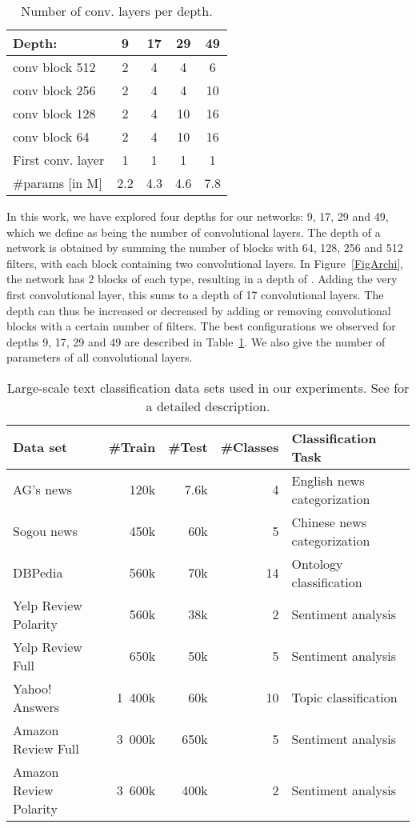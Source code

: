 \documentclass[a4paper,11pt]{article}
\begin{document}
\begin{table}[!ht]
  \centering
  \begin{tabular}{|lcccc|}
    \hline
    Depth: &  9 & 17 & 29 & 49\\
    \hline
    conv block 512 & 2 & 4 & 4 & 6 \\
    conv block 256 & 2 & 4 & 4 & 10 \\
    conv block 128 & 2 & 4 & 10 & 16 \\
    conv block 64 & 2 & 4 & 10 & 16 \\
    First conv. layer & 1 & 1 & 1 & 1 \\
    \hline
    \#params [in M] & 2.2 & 4.3 & 4.6 & 7.8 \\
    \hline
  \end{tabular}
    \caption{Number of conv. layers per depth.}
      \label{tabledepth}
  \vspace{-0.5cm}
\end{table}
In this work, we have explored four depths for our networks: 9, 17, 29 and 49, which
we define as being the number of convolutional layers. The depth of a network
is obtained by summing the number of blocks with 64, 128, 256 and 512 filters,
with each block containing two convolutional layers. In Figure~\ref{FigArchi}, the
network has 2 blocks of each type, resulting in a depth of
. Adding the very first convolutional layer, this sums to
a depth of 17 convolutional layers. The depth can thus be increased or
decreased by adding or removing convolutional blocks with a certain number
of filters. The best configurations we observed for depths 9, 17, 29 and 49 are
described in Table~\ref{tabledepth}.
We also give the number of parameters of all convolutional layers.


\begin{table*}[!ht]
  \centering
  \begin{tabular}{|lrrrl|}
    \hline
    Data set     & \#Train & \#Test & \#Classes & Classification Task \\
    \hline
    AG's news & 120k & 7.6k & 4 & English news categorization \\
    Sogou news  & 450k & 60k & 5  & Chinese news categorization \\
    DBPedia  & 560k & 70k & 14 & Ontology classification \\
    Yelp Review Polarity  & 560k & 38k & 2  &  Sentiment analysis \\
    Yelp Review Full & 650k & 50k & 5 & Sentiment analysis \\
    Yahoo! Answers & 1~400k &  60k & 10 & Topic classification \\
    Amazon Review Full &  3~000k & 650k & 5 & Sentiment analysis \\
    Amazon Review Polarity  & 3~600k & 400k &  2 & Sentiment analysis \\
    \hline
  \end{tabular}
    \caption{Large-scale text classification data sets used in our experiments.
	See \cite{Zhang:2015_nips:text_convnet} for a detailed description.}
	  \label{figdatasets}
\end{table*}
\end{document}
